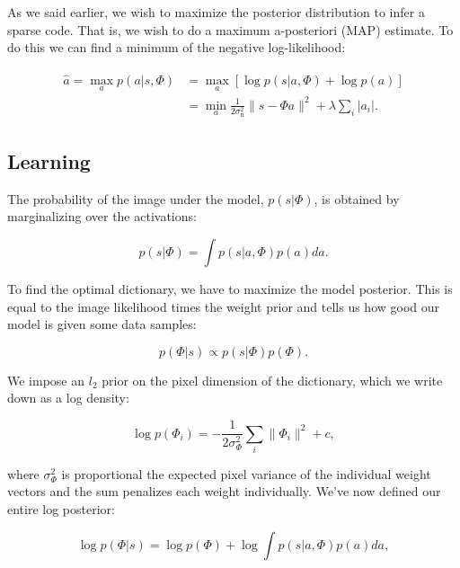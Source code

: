 As we said earlier, we wish to maximize the posterior distribution to infer a sparse code. That is, we wish to do a maximum a-posteriori (MAP) estimate. To do this we can find a minimum of the negative log-likelihood:

\begin{align}\label{eq:ch2_min_log_likelihood}
\begin{split}
    \hat{a} = \max_{a} p(a|s,\Phi) &= \max_{a}\left[\log{p(s|a,\Phi)} + \log{p(a)}\right] \\
                         &= \min_{a}\frac{1}{2\sigma_{\text{n}}^{2}}\|s - \Phi a\|^{2} + \lambda \sum_{i}|a_{i}|.
\end{split}
\end{align}

\subsection{Learning}
The probability of the image under the model, $p(s|\Phi)$, is obtained by marginalizing over the activations:

\begin{equation}\label{eq:ch2_image_probability}
    p(s|\Phi) = \int p(s|a,\Phi) p(a) da.
\end{equation}

To find the optimal dictionary, we have to maximize the model posterior. This is equal to the image likelihood times the weight prior and tells us how good our model is given some data samples:

\begin{equation}\label{eq:ch2_dictionary_posterior}
  p(\Phi|s) \propto p(s|\Phi)p(\Phi).
\end{equation}

We impose an $l_{2}$ prior on the pixel dimension of the dictionary, which we write down as a log density:

\begin{equation}\label{eq:ch2_dictionary_prior}
    \log p(\Phi_{i}) = -\frac{1}{2\sigma_{\Phi}^{2}}\sum_{i}\|\Phi_{i}\|^{2} + c,
\end{equation}

\noindent where $\sigma_{\Phi}^{2}$ is proportional the expected pixel variance of the individual weight vectors and the sum penalizes each weight individually. We've now defined our entire log posterior:

\begin{equation}\label{eq:ch2_log_probability_weight_complete}
    \log{p(\Phi|s)} = \log p(\Phi) + \log \int p(s|a,\Phi)p(a)da,
\end{equation}

